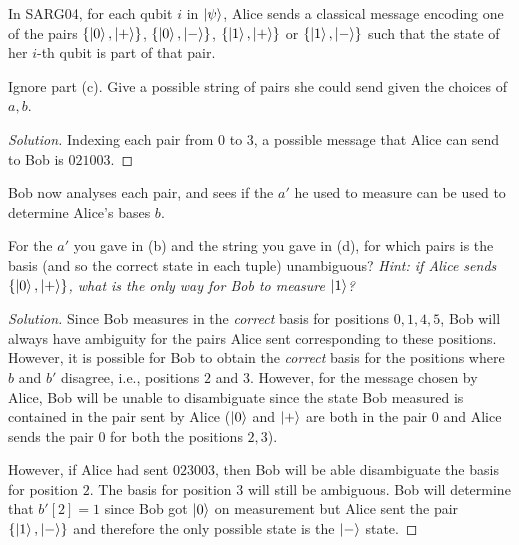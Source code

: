 \begin{solution}[label=ques:3d]
  \begin{question}
    In SARG04, for each qubit $i$ in $\ket{\psi}$, Alice sends a classical message encoding one of the pairs $\{\ket{0}, \ket{+}\}$, $\{\ket{0}, \ket{-}\}$, $\{\ket{1}, \ket{+}\}$ or $\{\ket{1}, \ket{-}\}$ such that the state of her $i$-th qubit is part of that pair. 

Ignore part (c). Give a possible string of pairs she could send given the choices of $a,b$.
  \end{question}
  \tcblower{}
  \begin{proof}[Solution]
    Indexing each pair from $0$ to $3$, a possible message that Alice can send to Bob is $021003$.
  \end{proof}
\end{solution}

\begin{solution}[label=ques:3e]
  \begin{question}
    Bob now analyses each pair, and sees if the $a'$ he used to measure can be used to determine Alice's bases $b$. 

For the $a'$ you gave in (b) and the string you gave in (d), for which pairs is the basis (and so the correct state in each tuple) unambiguous?
\textit{Hint: if Alice sends $\{\ket{0}, \ket{+}\}$, what is the only way for Bob to measure $\ket{1}$?}
  \end{question}
  \tcblower{}
  \begin{proof}[Solution]
    Since Bob measures in the \textit{correct} basis for positions $0, 1, 4, 5$, Bob will always have ambiguity for the pairs Alice sent corresponding to these positions. However, it is possible for Bob to obtain the \textit{correct} basis for the positions where $b$ and $b'$ disagree, i.e., positions $2$ and $3$. However, for the message chosen by Alice, Bob will be unable to disambiguate since the state Bob measured is contained in the pair sent by Alice ($\ket{0}$ and $\ket{+}$ are both in the pair $0$ and Alice sends the pair $0$ for both the positions $2, 3$).\par
    However, if Alice had sent $023003$, then Bob will be able disambiguate the basis for position $2$. The basis for position $3$ will still be ambiguous. Bob will determine that $b'[2] = 1$ since Bob got $\ket{0}$ on measurement but Alice sent the pair $\{\ket{1}, \ket{-}\}$ and therefore the only possible state is the $\ket{-}$ state.
  \end{proof}
\end{solution}

